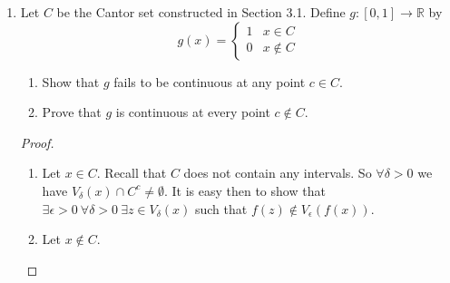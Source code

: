 \begin{enumerate}
\begin{proof}
\begin{enumerate}
            \item 
            \[
            f(x) = \begin{cases} x &, x \in A \\ 2 & x \not\in A \end{cases}
            \]
        \end{enumerate}
        \end{proof}
        
        \item Let \( C \) be the Cantor set constructed in Section 3.1. Define \( g: [0,1] \rightarrow \mathbb{R} \) by
        \[
        g(x) = \begin{cases} 1 & x \in C \\ 0 & x \not\in C \end{cases}
        \]
        \begin{enumerate}
            \item Show that \( g \) fails to be continuous at any point \( c \in C \).
            \item Prove that \( g \) is continuous at every point \( c \not\in C \).
        \end{enumerate}
        \begin{proof}
        \begin{enumerate}
            \item Let \( x \in C \). Recall that \( C \) does not contain any intervals. So \( \forall \delta > 0 \) we have \( V_{\delta}(x) \cap C^{c} \neq \emptyset \). It is easy then to show that \( \exists \epsilon > 0  \: \forall \delta > 0 \: \exists z \in V_{\delta}(x) \) such that \( f(z) \not\in V_{\epsilon}(f(x)) \).
            
            \item Let \( x \not\in C \). 
        \end{enumerate}
        \end{proof}
\end{enumerate}